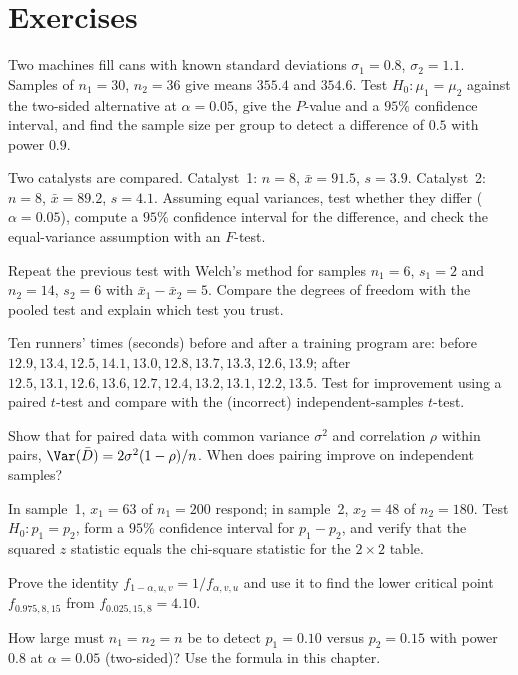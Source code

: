 \section{Exercises}

\begin{exercise}
Two machines fill cans with known standard deviations $\sigma_1=0.8$, $\sigma_2=1.1$. Samples of $n_1=30$, $n_2=36$ give means $355.4$ and $354.6$. Test $H_0:\mu_1=\mu_2$ against the two-sided alternative at $\alpha=0.05$, give the $P$-value and a $95\%$ confidence interval, and find the sample size per group to detect a difference of $0.5$ with power $0.9$.
\end{exercise}

\begin{exercise}
Two catalysts are compared. Catalyst~1: $n=8$, $\bar{x}=91.5$, $s=3.9$. Catalyst~2: $n=8$, $\bar{x}=89.2$, $s=4.1$. Assuming equal variances, test whether they differ ($\alpha=0.05$), compute a $95\%$ confidence interval for the difference, and check the equal-variance assumption with an $F$-test.
\end{exercise}

\begin{exercise}
Repeat the previous test with Welch's method for samples $n_1=6$, $s_1=2$ and $n_2=14$, $s_2=6$ with $\bar{x}_1-\bar{x}_2=5$. Compare the degrees of freedom with the pooled test and explain which test you trust.
\end{exercise}

\begin{exercise}
Ten runners' times (seconds) before and after a training program are: before $12.9,13.4,12.5,14.1,13.0,12.8,13.7,13.3,12.6,13.9$; after $12.5,13.1,12.6,13.6,12.7,12.4,13.2,13.1,12.2,13.5$. Test for improvement using a paired $t$-test and compare with the (incorrect) independent-samples $t$-test.
\end{exercise}

\begin{exercise}
Show that for paired data with common variance $\sigma^2$ and correlation $\rho$ within pairs, $\Var(\bar{D})=2\sigma^2(1-\rho)/n$. When does pairing improve on independent samples?
\end{exercise}

\begin{exercise}
In sample~1, $x_1=63$ of $n_1=200$ respond; in sample~2, $x_2=48$ of $n_2=180$. Test $H_0:p_1=p_2$, form a $95\%$ confidence interval for $p_1-p_2$, and verify that the squared $z$ statistic equals the chi-square statistic for the $2\times2$ table.
\end{exercise}

\begin{exercise}
Prove the identity $f_{1-\alpha,u,v}=1/f_{\alpha,v,u}$ and use it to find the lower critical point $f_{0.975,8,15}$ from $f_{0.025,15,8}=4.10$.
\end{exercise}

\begin{exercise}
How large must $n_1=n_2=n$ be to detect $p_1=0.10$ versus $p_2=0.15$ with power $0.8$ at $\alpha=0.05$ (two-sided)? Use the formula in this chapter.
\end{exercise}
